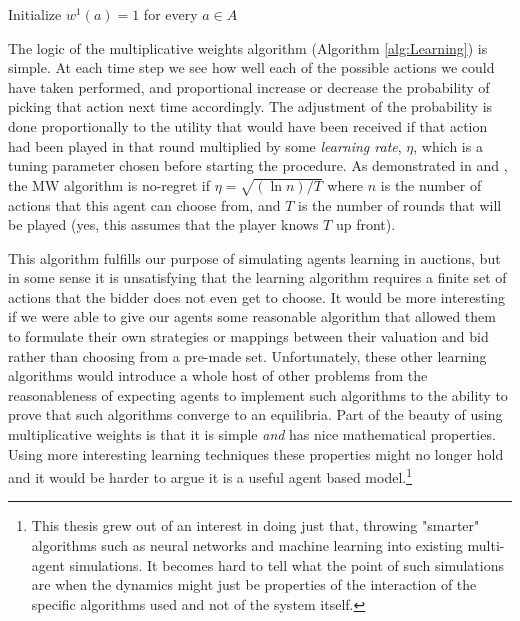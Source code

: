 \documentclass[12pt,twoside]{reedthesis}
\begin{document}
\begin{algorithm}[H]
	Initialize $w^1(a) = 1$ for every $a\in A$\\
\label{alg:Learning}
\end{algorithm}
\vspace{1cm}
The logic of the multiplicative weights algorithm (Algorithm \ref{alg:Learning}) is simple. At each time step we see how well each of the possible actions we could have taken performed, and proportional increase or decrease the probability of picking that action next time accordingly.  The adjustment of the probability is done proportionally to the utility that would have been received if that action had been played in that round multiplied by some \textit{learning rate}, $\eta$, which is a tuning parameter chosen before starting the procedure. As demonstrated in \cite{Roughgarden2016} and \cite{Blum2007}, the MW algorithm is no-regret if $\eta = \sqrt{(\ln n) / T}$ where $n$ is the number of actions that this agent can choose from, and $T$ is the number of rounds that will be played (yes, this assumes that the player knows $T$ up front).

This algorithm fulfills our purpose of simulating agents learning in auctions, but in some sense it is unsatisfying that the learning algorithm requires a finite set of actions that the bidder does not even get to choose. It would be more interesting if we were able to give our agents some reasonable algorithm that allowed them to formulate their own strategies or mappings between their valuation and bid rather than choosing from a pre-made set. Unfortunately, these other learning algorithms would introduce a whole host of other problems from the reasonableness of expecting agents to implement such algorithms to the ability to prove that such algorithms converge to an equilibria. Part of the beauty of using multiplicative weights is that it is simple {\em and} has nice mathematical properties. Using more interesting learning techniques these properties might no longer hold and it would be harder to argue it is a useful agent based model.\footnote{This thesis grew out of an interest in doing just that, throwing "smarter" algorithms such as neural networks and machine learning into existing multi-agent simulations. It becomes hard to tell what the point of such simulations are when the dynamics might just be properties of the interaction of the specific algorithms used and not of the system itself.}
\end{document}
